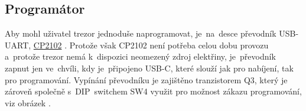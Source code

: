 \subsection*{Programátor}
Aby mohl uživatel trezor jednoduše naprogramovat, je~na~desce převodník USB-UART, \href{https://www.silabs.com/documents/public/data-sheets/cp2102n-datasheet.pdf}{CP2102} \parencite{cp2102}.
Protože však CP2102 není potřeba celou dobu provozu a~protože trezor nemá k~dispozici neomezený zdroj elektřiny, je~převodník zapnut jen ve~chvíli, 
kdy je~připojeno USB-C, které slouží jak pro nabíjení, tak pro programování. Vypínání převodníku je zajištěno tranzistorem Q3, který je zároveň společně 
s~DIP~switchem SW4 využit pro možnost zákazu programování, viz obrázek .
